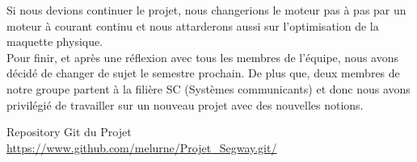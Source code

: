 \documentclass[oneside,a4paper,12pt]{article}
\begin{document}
	Si nous devions continuer le projet, nous changerions le moteur pas à pas par un moteur à courant continu et nous attarderons aussi sur l'optimisation de la maquette physique.\\

	Pour finir, et après une réflexion avec tous les membres de l’équipe, nous avons décidé de changer de sujet le semestre prochain. De plus que, deux membres de notre groupe partent à la filière SC (Systèmes communicants) et donc nous avons privilégié de travailler sur un nouveau projet avec des nouvelles notions.
	
	Repository Git du Projet\\
	\sloppy
	\url{https://www.github.com/melurne/Projet_Segway.git/}
\end{document}
